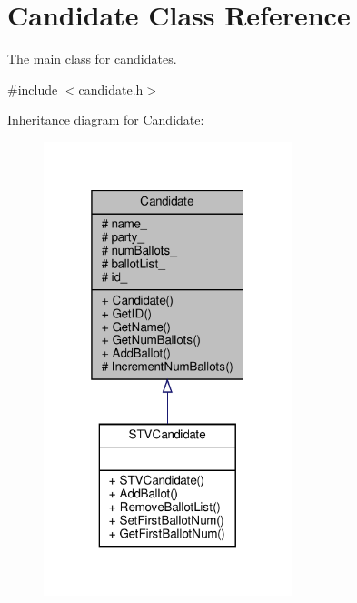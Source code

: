 \hypertarget{classCandidate}{}\section{Candidate Class Reference}
\label{classCandidate}


The main class for candidates.  




{\ttfamily \#include $<$candidate.\+h$>$}



Inheritance diagram for Candidate\+:\nopagebreak
\begin{figure}[H]
\begin{center}
\leavevmode
\includegraphics[width=205pt]{classCandidate__inherit__graph}
\end{center}
\end{figure}


